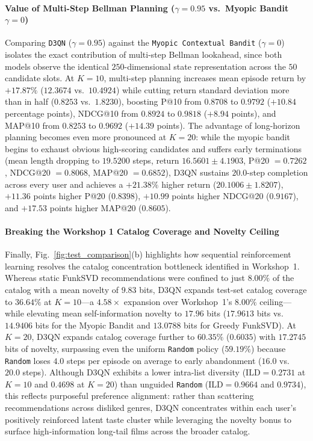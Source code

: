 \paragraph{Value of Multi-Step Bellman Planning ($\gamma = 0.95$ vs.\ Myopic Bandit $\gamma = 0$)}
Comparing \texttt{D3QN} ($\gamma = 0.95$) against the \texttt{Myopic Contextual Bandit} ($\gamma = 0$) isolates the exact contribution of multi-step Bellman lookahead, since both models observe the identical $250$-dimensional state representation across the $50$ candidate slots. At $K=10$, multi-step planning increases mean episode return by $+17.87\%$ ($12.3674$ vs.\ $10.4924$) while cutting return standard deviation more than in half ($0.8253$ vs.\ $1.8230$), boosting P@10 from $0.8708$ to $0.9792$ ($+10.84$ percentage points), NDCG@10 from $0.8924$ to $0.9818$ ($+8.94$ points), and MAP@10 from $0.8253$ to $0.9692$ ($+14.39$ points). The advantage of long-horizon planning becomes even more pronounced at $K = 20$: while the myopic bandit begins to exhaust obvious high-scoring candidates and suffers early terminations (mean length dropping to $19.5200$ steps, return $16.5601 \pm 4.1903$, P@20 $= 0.7262$, NDCG@20 $= 0.8068$, MAP@20 $= 0.6852$), D3QN sustains $20.0$-step completion across every user and achieves a $+21.38\%$ higher return ($20.1006 \pm 1.8207$), $+11.36$ points higher P@20 ($0.8398$), $+10.99$ points higher NDCG@20 ($0.9167$), and $+17.53$ points higher MAP@20 ($0.8605$).

\paragraph{Breaking the Workshop 1 Catalog Coverage and Novelty Ceiling}
Finally, Fig.~\ref{fig:test_comparison}(b) highlights how sequential reinforcement learning resolves the catalog concentration bottleneck identified in Workshop~1. Whereas static FunkSVD recommendations were confined to just $8.00\%$ of the catalog with a mean novelty of $9.83$ bits, D3QN expands test-set catalog coverage to $36.64\%$ at $K=10$---a $4.58\times$ expansion over Workshop~1's $8.00\%$ ceiling---while elevating mean self-information novelty to $17.96$ bits ($17.9613$ bits vs.\ $14.9406$ bits for the Myopic Bandit and $13.0788$ bits for Greedy FunkSVD). At $K=20$, D3QN expands catalog coverage further to $60.35\%$ ($0.6035$) with $17.2745$ bits of novelty, surpassing even the uniform \texttt{Random} policy ($59.19\%$) because \texttt{Random} loses $4.0$ steps per episode on average to early abandonment ($16.0$ vs.\ $20.0$ steps). Although D3QN exhibits a lower intra-list diversity ($\text{ILD} = 0.2731$ at $K=10$ and $0.4698$ at $K=20$) than unguided \texttt{Random} ($\text{ILD} = 0.9664$ and $0.9734$), this reflects purposeful preference alignment: rather than scattering recommendations across disliked genres, D3QN concentrates within each user's positively reinforced latent taste cluster while leveraging the novelty bonus to surface high-information long-tail films across the broader catalog.
